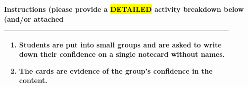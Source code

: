 \documentclass{article}
\begin{document}
\newpage
\noindent
{\large\textbf{Instructions (please provide a \hl{DETAILED} activity breakdown below (and/or attached}}

\begin{tabular}{|p{0.9\linewidth}|}
\hline
\begin{enumerate}[label=\alph*.][itemsep=0.3em]
   \item Students are put into small groups and are asked to write down their confidence on a single notecard without names.
   \item The cards are evidence of the group's confidence in the content.
\end{enumerate}
\\ \hline
\end{tabular}

\vspace{0.5cm}
\noindent
\end{document}
